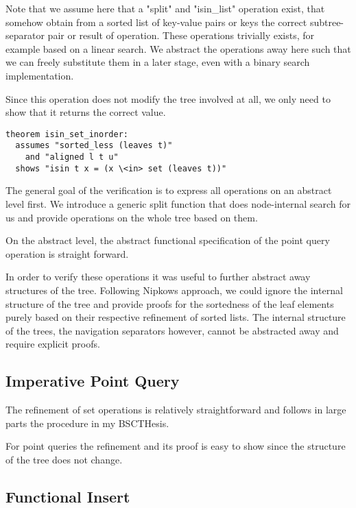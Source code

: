 \documentclass[a4paper,UKenglish,cleveref, autoref, thm-restate]{lipics-v2021}
\begin{document}
Note that we assume here that a "split" and "isin\_list" operation exist,
that somehow obtain from a sorted list of key-value pairs or keys
the correct subtree-separator pair or result of operation.
These operations trivially exists, for example based on a linear search.
We abstract the operations away here such that we can freely substitute them in a
later stage, even with a binary search implementation.

Since this operation does not modify the tree involved at all,
we only need to show that it returns the correct value.

\begin{lstlisting}[mathescape=true, language=Isabelle,label=lst:isin-set-inorder]
theorem isin_set_inorder:
  assumes "sorted_less (leaves t)"
    and "aligned l t u"
  shows "isin t x = (x \<in> set (leaves t))"
\end{lstlisting}



The general goal of the verification is to express
all operations on an abstract level first.
We introduce a generic split function that does node-internal search
for us and provide operations on the whole tree based on them.

On the abstract level, the abstract functional specification
of the point query operation is straight forward.


In order to verify these operations it was useful to further
abstract away structures of the tree.
Following Nipkows approach, we could ignore the internal structure of the tree
and provide proofs for the sortedness of the leaf elements purely
based on their respective refinement of sorted lists.
The internal structure of the trees, the navigation separators however,
cannot be abstracted away and require explicit proofs.


\subsection{Imperative Point Query}
\label{sec:imperative_pq}

The refinement of set operations is relatively straightforward and
follows in large parts the procedure in my BSCTHesis.

For point queries the refinement and its proof is easy
to show since the structure of the tree does not change.

\subsection{Functional Insert}
\label{sec:functional_insert}
\end{document}

